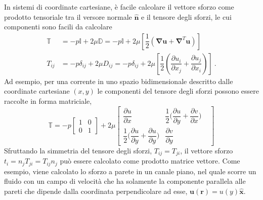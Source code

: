 In sistemi di coordinate cartesiane, è facile calcolare il vettore sforzo come prodotto tensoriale tra il versore normale $\bm{\hat{n}}$ e il tensore degli sforzi, le cui componenti sono facili da calcolare 
\begin{equation}
\begin{aligned}
 \mathbb{T} & = -p\mathbb{I} + 2\mu\mathbb{D} = -p\mathbb{I} + 2\mu \left[ \dfrac{1}{2} \left( \bm{\nabla}\bm{u} +\bm{\nabla}^T \bm{u} \right) \right] \\
 T_{ij} & = -p \delta_{ij} + 2 \mu D_{ij} = -p \delta_{ij} + 2 \mu \left[ \dfrac{1}{2} \left( \dfrac{\partial u_i}{\partial x_j} + \dfrac{\partial u_j}{\partial x_i} \right) \right] \ .
 \end{aligned}
\end{equation}
 Ad esempio, per una corrente in uno spazio bidimensionale descritto dalle coordinate cartesiane $(x,y)$ le componenti del tensore degli sforzi possono essere raccolte in forma matriciale,
\begin{equation}
 \mathbb{T} =
 -p \begin{bmatrix}
   1 & 0 \\ 0 & 1
 \end{bmatrix} +
 2 \mu \begin{bmatrix}
  \dfrac{\partial u}{\partial x} & 
  \dfrac{1}{2}\bigg(\dfrac{\partial u}{\partial y} + \dfrac{\partial v}{\partial x}\bigg) \\
  \dfrac{1}{2}\bigg(\dfrac{\partial u}{\partial y} + \dfrac{\partial u}{\partial y}\bigg) &
  \dfrac{\partial v}{\partial y} & 
 \end{bmatrix}
\end{equation}
%
Sfruttando la simmetria del tensore degli sforzi, $T_{ij} = T_{ji}$, il vettore sforzo $t_i = n_j T_{ji} = T_{ij} n_j$ può essere calcolato come prodotto matrice vettore.
Come esempio, viene calcolato lo sforzo a parete in un canale piano, nel quale scorre un fluido con un campo di velocità che ha solamente la componente parallela alle pareti che dipende dalla coordinata perpendicolare ad esse, $\bm{u}(\bm{r}) = u(y) \bm{\hat{x}}$.
